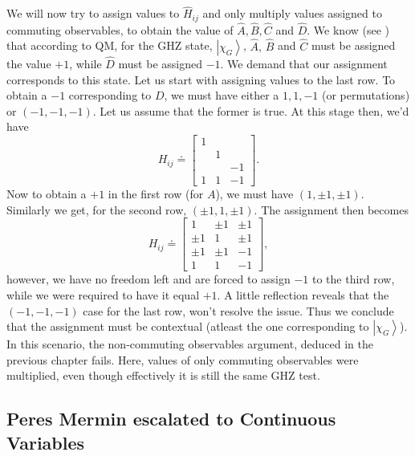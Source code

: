 We will now try to assign values to $\hat{H}_{ij}$ and only multiply
values assigned to commuting observables, to obtain the value of $\hat{A},\hat{B},\hat{C}$
and $\hat{D}$. We know (see )
that according to QM, for the GHZ state, $\left|\chi_{G}\right\rangle $,
$\hat{A},\,\hat{B}$ and $\hat{C}$ must be assigned the value $+1$,
while $\hat{D}$ must be assigned $-1$. We demand that our assignment
corresponds to this state. Let us start with assigning values to the
last row. To obtain a $-1$ corresponding to $D$, we must have either
a $1,1,-1$ (or permutations) or $(-1,-1,-1)$. Let us assume that
the former is true. At this stage then, we'd have 
\[
H_{ij}\doteq\left[\begin{array}{ccc}
1\\
 & 1\\
 &  & -1\\
1 & 1 & -1
\end{array}\right].
\]
Now to obtain a $+1$ in the first row (for $A$), we must have $(1,\pm1,\pm1)$.
Similarly we get, for the second row, $(\pm1,1,\pm1)$. The assignment
then becomes 
\[
H_{ij}\doteq\left[\begin{array}{ccc}
1 & \pm1 & \pm1\\
\pm1 & 1 & \pm1\\
\pm1 & \pm1 & -1\\
1 & 1 & -1
\end{array}\right],
\]
however, we have no freedom left and are forced to assign $-1$ to
the third row, while we were required to have it equal $+1$. A little
reflection reveals that the $(-1,-1,-1)$ case for the last row, won't
resolve the issue. Thus we conclude that the assignment must be contextual
(atleast the one corresponding to $\left|\chi_{G}\right\rangle $).
In this scenario, the non-commuting observables argument, deduced
in the previous chapter fails. Here, values of only commuting observables
were multiplied, even though effectively it is still the same GHZ
test.


\subsection{Peres Mermin escalated to Continuous Variables \label{sub:Peres-Mermin-phaseSpace}}

